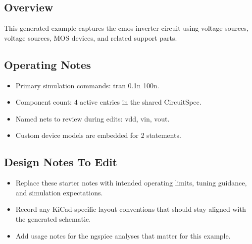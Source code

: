 \subsection*{Overview}
This generated example captures the cmos inverter circuit using voltage sources, voltage sources, MOS devices, and related support parts.

\subsection*{Operating Notes}
\begin{itemize}
  \item Primary simulation commands: tran 0.1n 100n.
  \item Component count: 4 active entries in the shared CircuitSpec.
  \item Named nets to review during edits: vdd, vin, vout.
  \item Custom device models are embedded for 2 statements.
\end{itemize}
\subsection*{Design Notes To Edit}
\begin{itemize}
  \item Replace these starter notes with intended operating limits, tuning guidance, and simulation expectations.
  \item Record any KiCad-specific layout conventions that should stay aligned with the generated schematic.
  \item Add usage notes for the ngspice analyses that matter for this example.
\end{itemize}
